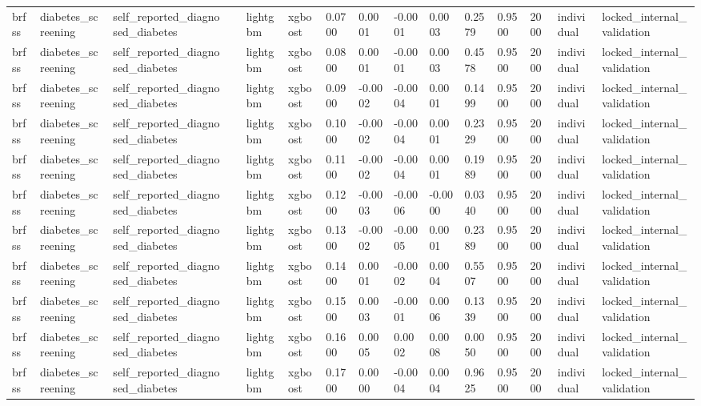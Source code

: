 \begin{tabular}{lllllllllllllll}
brfss & diabetes\_screening & self\_reported\_diagnosed\_diabetes &  & lightgbm & xgboost & 0.0700 & 0.0001 & -0.0001 & 0.0003 & 0.2579 & 0.9500 & 2000 & individual & locked\_internal\_validation \\
brfss & diabetes\_screening & self\_reported\_diagnosed\_diabetes &  & lightgbm & xgboost & 0.0800 & 0.0001 & -0.0001 & 0.0003 & 0.4578 & 0.9500 & 2000 & individual & locked\_internal\_validation \\
brfss & diabetes\_screening & self\_reported\_diagnosed\_diabetes &  & lightgbm & xgboost & 0.0900 & -0.0002 & -0.0004 & 0.0001 & 0.1499 & 0.9500 & 2000 & individual & locked\_internal\_validation \\
brfss & diabetes\_screening & self\_reported\_diagnosed\_diabetes &  & lightgbm & xgboost & 0.1000 & -0.0002 & -0.0004 & 0.0001 & 0.2329 & 0.9500 & 2000 & individual & locked\_internal\_validation \\
brfss & diabetes\_screening & self\_reported\_diagnosed\_diabetes &  & lightgbm & xgboost & 0.1100 & -0.0002 & -0.0004 & 0.0001 & 0.1989 & 0.9500 & 2000 & individual & locked\_internal\_validation \\
brfss & diabetes\_screening & self\_reported\_diagnosed\_diabetes &  & lightgbm & xgboost & 0.1200 & -0.0003 & -0.0006 & -0.0000 & 0.0340 & 0.9500 & 2000 & individual & locked\_internal\_validation \\
brfss & diabetes\_screening & self\_reported\_diagnosed\_diabetes &  & lightgbm & xgboost & 0.1300 & -0.0002 & -0.0005 & 0.0001 & 0.2389 & 0.9500 & 2000 & individual & locked\_internal\_validation \\
brfss & diabetes\_screening & self\_reported\_diagnosed\_diabetes &  & lightgbm & xgboost & 0.1400 & 0.0001 & -0.0002 & 0.0004 & 0.5507 & 0.9500 & 2000 & individual & locked\_internal\_validation \\
brfss & diabetes\_screening & self\_reported\_diagnosed\_diabetes &  & lightgbm & xgboost & 0.1500 & 0.0003 & -0.0001 & 0.0006 & 0.1339 & 0.9500 & 2000 & individual & locked\_internal\_validation \\
brfss & diabetes\_screening & self\_reported\_diagnosed\_diabetes &  & lightgbm & xgboost & 0.1600 & 0.0005 & 0.0002 & 0.0008 & 0.0050 & 0.9500 & 2000 & individual & locked\_internal\_validation \\
brfss & diabetes\_screening & self\_reported\_diagnosed\_diabetes &  & lightgbm & xgboost & 0.1700 & 0.0000 & -0.0004 & 0.0004 & 0.9625 & 0.9500 & 2000 & individual & locked\_internal\_validation \\

\end{tabular}
